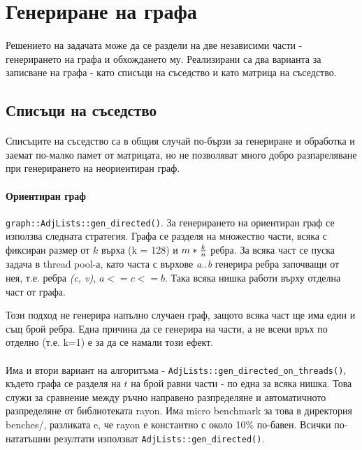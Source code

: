 \section{Генериране на графа}

\paragraph*{} Решението на задачата може да се раздели на две независими части - генерирането на графа и обхождането му. Реализирани са два варианта за записване на графа - като списъци на съседство и като матрица на съседство.

\subsection{Списъци на съседство}

\paragraph*{} Списъците на съседство са в общия случай по-бързи за генериране и обработка и заемат по-малко памет от матрицата, но не позволяват много добро разпареляване при генерирането на неориентиран граф.

\paragraph*{Ориентиран граф} \verb|graph::AdjLists::gen_directed()|. За генерирането на ориентиран граф се използва следната стратегия. Графа се разделя на множество части, всяка с фиксиран размер от $k$ върха (k = 128) и $m * {k \over n}$ ребра. За всяка част се пуска задача в thread pool-а, като часта с върхове \textit{a..b} генерира ребра започващи от нея, т.е. ребра \textit{(c, v)}, $a <= c <= b$. Така всяка нишка работи върху отделна част от графа.

Този подход не генерира напълно случаен граф, защото всяка част ще има един и същ брой ребра. Една причина да се генерира на части, а не всеки връх по отделно (т.е. k=1) е за да се намали този ефект.

\paragraph*{} Има и втори вариант на алгоритъма - \verb|AdjLists::gen_directed_on_threads()|, където графа се разделя на $t$ на брой равни части - по една за всяка нишка. Това служи за сравнение между ръчно направено разпределяне и автоматичното разпределяне от библиотеката rayon. Има micro benchmark за това в директория benches/, разликата e, че rayon е константно с около 10\% по-бавен. Всички по-нататъшни резултати използват \verb|AdjLists::gen_directed()|.

